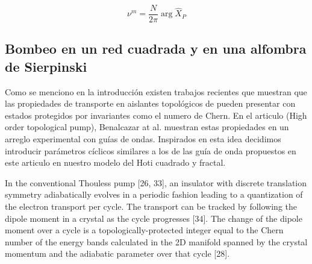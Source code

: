 \begin{equation}
\label{eq:Wannier_center}
    \nu^m = \frac{N}{2\pi} \; \text{arg} \; \hat{X}_P
\end{equation}





\subsection{Bombeo en un red cuadrada y en una alfombra de Sierpinski}



Como se menciono en la introducción existen trabajos recientes que muestran que las propiedades de transporte en aislantes topológicos de pueden presentar con estados protegidos por invariantes como el numero de Chern. En el articulo (High order topological pump), Benalcazar at al. muestran estas propiedades en un arreglo experimental con guías de ondas. Inspirados en esta idea decidimos introducir parámetros cíclicos similares a los de las guía de onda propuestos en este articulo en nuestro modelo del Hoti cuadrado y fractal.

In the conventional Thouless pump [26, 33], an insulator with discrete translation symmetry adiabatically
evolves in a periodic fashion leading to a quantization
of the electron transport per cycle. The transport can be
tracked by following the dipole moment in a crystal as the
cycle progresses [34]. The change of the dipole moment
over a cycle is a topologically-protected integer equal to
the Chern number of the energy bands calculated in the
2D manifold spanned by the crystal momentum and the
adiabatic parameter over that cycle [28].